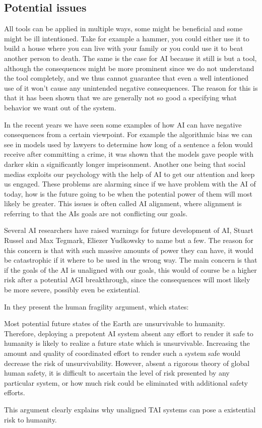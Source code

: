 \documentclass[12pt,A4]{report}
\theoremstyle{definition}
\begin{document}
\subsection{Potential issues}
All tools can be applied in multiple ways, some might be beneficial and some might be ill intentioned. Take for example a hammer, you could either use it to build a house where you can live with your family or you could use it to beat another person to death. The same is the case for AI because it still is but a tool, although the consequences might be more prominent since we do not understand the tool completely, and we thus cannot guarantee that even a well intentioned use of it won't cause any unintended negative consequences. The reason for this is that it has been shown that we are generally not so good a specifying what behavior we want out of the system.

In the recent years we have seen some examples of how AI can have negative consequences from a certain viewpoint. For example the algorithmic bias we can see in models used by lawyers to determine how long of a sentence a felon would receive after committing a crime, it was shown that the models gave people with darker skin a significantly longer imprisonment. Another one being that social medias exploits our psychology with the help of AI to get our attention and keep us engaged. These problems are alarming since if we have problem with the AI of today, how is the future going to be when the potential power of them will most likely be greater. This issues is often called AI alignment, where alignment is referring to that the AIs goals are not conflicting our goals. 

Several AI researchers have raised warnings for future development of AI, Stuart Russel and Max Tegmark, Eliezer Yudkowsky to name but a few. The reason for this concern is that with such massive amounts of power they can have, it would be catastrophic if it where to be used in the wrong way. The main concern is that if the goals of the AI is unaligned with our goals, this would of course be a higher risk after a potential AGI breakthrough, since the consequences will most likely be more severe, possibly even be existential. 

In \autocite{Critch Kruger} they present the human fragility argument, which states: 
\begin{displayquote}
Most potential future states of the Earth are unsurvivable to humanity. Therefore, deploying a prepotent AI system absent any effort to render it safe to humanity is likely to realize a future state which is unsurvivable. Increasing the amount and quality of coordinated effort to render such a system safe would decrease the risk of unsurvivability. However, absent a rigorous theory of global human safety, it is difficult to ascertain the level of risk presented by any particular system, or how much risk could be eliminated with additional safety efforts.
\end{displayquote}
This argument clearly explains why unaligned TAI systems can pose a existential risk to humanity. 
\end{document}
